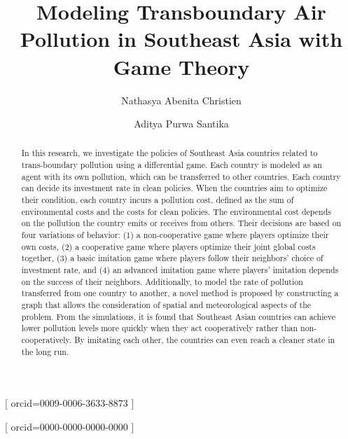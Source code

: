 \documentclass[a4paper,fleqn]{cas-dc}
\begin{document}
\let\WriteBookmarks\relax
\def\floatpagepagefraction{1}
\def\textpagefraction{.001}



\title[mode=title]{Modeling Transboundary Air Pollution in Southeast Asia with Game Theory}

\author[1]{Nathasya Abenita Christien}[
  orcid=0009-0006-3633-8873
]
\cormark[1]
\fnmark[1]


\author[2]{Aditya Purwa Santika}[
  orcid=0000-0000-0000-0000
]
\fnmark[2]


\fntext[1]{}

\begin{abstract}
In this research, we investigate the policies of Southeast Asia countries related to trans-boundary pollution using a differential game. Each country is modeled as an agent with its own pollution, which can be transferred to other countries. Each country can decide its investment rate in clean policies. When the countries aim to optimize their condition, each country incurs a pollution cost, defined as the sum of environmental costs and the costs for clean policies. The environmental cost depends on the pollution the country emits or receives from others. Their decisions are based on four variations of behavior: (1) a non-cooperative game where players optimize their own costs, (2) a cooperative game where players optimize their joint global costs together, (3) a basic imitation game where players follow their neighbors' choice of investment rate, and (4) an advanced imitation game where players' imitation depends on the success of their neighbors. Additionally, to model the rate of pollution transferred from one country to another, a novel method is proposed by constructing a graph that allows the consideration of spatial and meteorological aspects of the problem. From the simulations, it is found that Southeast Asian countries can achieve lower pollution levels more quickly when they act cooperatively rather than non-cooperatively. By imitating each other, the countries can even reach a cleaner state in the long run.
\end{abstract}
\end{document}
